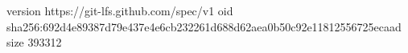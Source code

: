 version https://git-lfs.github.com/spec/v1
oid sha256:692d4e89387d79e437e4e6cb232261d688d62aea0b50c92e11812556725ecaad
size 393312

